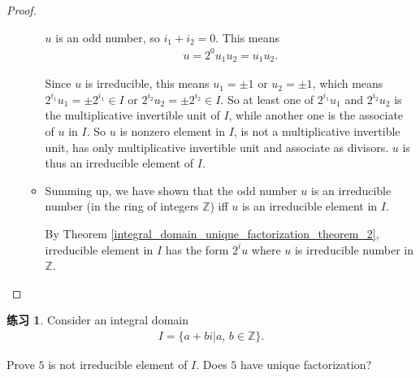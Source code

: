 \documentclass[utf8]{ctexbook}
\theoremstyle{definition}
\newtheorem{exercise}{练习}[section]
\begin{document}
\begin{proof}
\begin{enumerate}
\begin{itemize}
{$u$ is an odd number, so $i_1 + i_2 =0$. This means 
\begin{align*}
u = 2^0 u_1 u_2 = u_1 u_2 .
\end{align*}

Since $u$ is irreducible, this means $u_1 = \pm 1$ or $u_2 = \pm 1$, which means $2^{i_1}u_1 = \pm  2^{i_1} \in I$ or $ 2^{i_2} u_2 = \pm 2^{i_2} \in I$. So at least one of $2^{i_1}u_1$ and $2^{i_2} u_2 $ is the multiplicative invertible unit of $I$, while another one is the associate of $u$ in $I$. So $u$ is nonzero element in $I$, is not a multiplicative invertible unit, has only multiplicative invertible unit and associate as divisors. $u$ is thus an irreducible element of $I$. 
 }
\item{Summing up, we have shown that the odd number $u$ is an irreducible number (in the ring of integers $\mathbb{Z}$) iff $u$ is an irreducible element in $I$. 

By Theorem \ref{integral_domain_unique_factorization_theorem_2}, irreducible element in $I$ has the form $2^i u$ where $u$ is irreducible number in $\mathbb{Z}$.}
\end{itemize}

\end{enumerate}

\end{proof}


\begin{exercise}
Consider an integral domain
\begin{align*}
I = \{ a + bi | a, \, b \in \mathbb{Z} \} .
\end{align*}

Prove $5$ is not irreducible element of $I$. Does $5$ have unique factorization?

\end{exercise}
\end{document}
